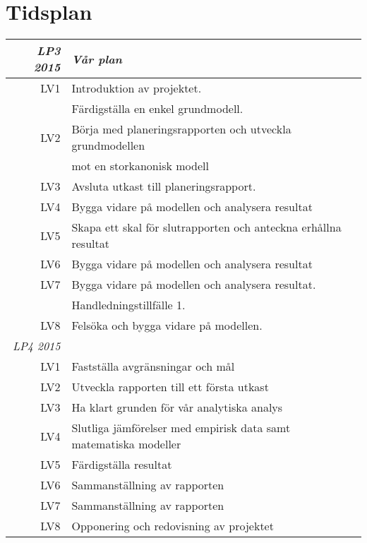 \section{Tidsplan}


\begin{center}
\begin{tabular}{| r| l| } \hline

 \emph{LP3 2015} & \emph{Vår plan} \\ \hline
  LV1 & Introduktion av projektet. \\& Färdigställa en enkel grundmodell.  \\ \hline
  LV2 & Börja med planeringsrapporten och utveckla grundmodellen \\& mot en storkanonisk modell \\ \hline
  LV3 & Avsluta utkast till planeringsrapport.\\ \hline
  LV4 & Bygga vidare på modellen och analysera resultat \\ \hline
  LV5 & Skapa ett skal för slutrapporten och anteckna erhållna resultat \\ \hline
  LV6 & Bygga vidare på modellen och analysera resultat \\ \hline
  LV7 & Bygga vidare på modellen och analysera resultat. \\& Handledningstillfälle 1. \\ \hline
  LV8 & Felsöka och bygga vidare på modellen. \\ \hline
  \emph{LP4 2015} &  \\ \hline
  LV1 & Fastställa avgränsningar och mål \\ \hline
  LV2 & Utveckla rapporten till ett första utkast \\ \hline
  LV3 & Ha klart grunden för vår analytiska analys \\ \hline
  LV4 & Slutliga jämförelser med empirisk data samt matematiska modeller \\ \hline
  LV5 & Färdigställa resultat \\ \hline
  LV6 & Sammanställning av rapporten \\ \hline  
  LV7 & Sammanställning av rapporten \\ \hline  
  LV8 & Opponering och redovisning av projektet \\ \hline
\end{tabular}
\label{tidsplan}
\end{center} 